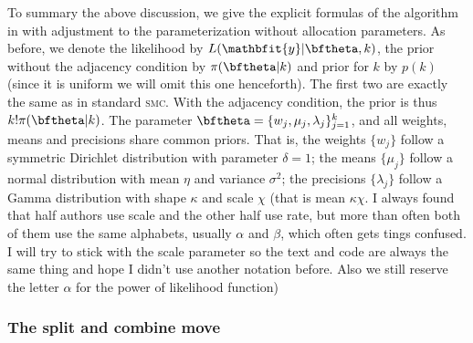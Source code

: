 \documentclass[11pt, bib, fontset = Minion]{marticle}
\def\smc{\textsc{smc}\xspace}
\def\by{\mathbfit{y}}
\begin{document}
  To summary the above discussion, we give the explicit formulas of the
  algorithm in \textcite{Richardson:1997ea} with adjustment to the
  parameterization without allocation parameters. As before, we denote the
  likelihood by $L(\by|\bftheta,k)$, the prior without the adjacency condition
  by $\pi(\bftheta|k)$ and prior for $k$ by $p(k)$ (since it is uniform we will
  omit this one henceforth). The first two are exactly the same as in standard
  \smc. With the adjacency condition, the prior is thus $k!\pi(\bftheta|k)$.
  The parameter $\bftheta = \{w_j, \mu_j, \lambda_j\}_{j=1}^k$, and all
  weights, means and precisions share common priors. That is, the weights
  $\{w_j\}$ follow a symmetric Dirichlet distribution with parameter $\delta =
  1$; the means $\{\mu_j\}$ follow a normal distribution with mean $\eta$ and
  variance $\sigma^2$; the precisions $\{\lambda_j\}$ follow a Gamma
  distribution with shape $\kappa$ and scale $\chi$ (that is mean
  $\kappa\chi$. I always found that half authors use scale and the other half
  use rate, but more than often both of them use the same alphabets, usually
  $\alpha$ and $\beta$, which often gets tings confused. I will try to stick
  with the scale parameter so the text and code are always the same thing and
  hope I didn't use another notation before. Also we still reserve the letter
  $\alpha$ for the power of likelihood function)

  \subsubsection{The split and combine move}
\end{document}

